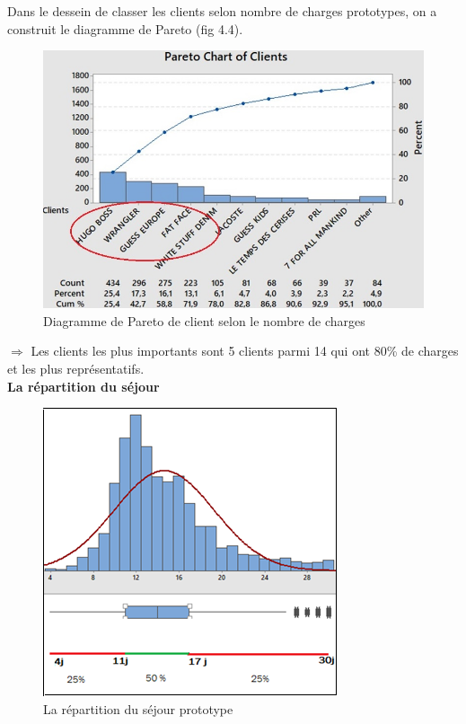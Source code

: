 \documentclass[12pt, a4paper]{thesis}
\begin{document}
Dans le dessein de classer les clients selon nombre de charges prototypes, on a construit le diagramme de Pareto (fig 4.4).

 \begin{figure}[!h]

 \begin{center}

 \includegraphics[scale=0.65]{parProto.jpg}

 \caption{Diagramme de Pareto de client selon le nombre de charges }

 \end{center}

\end{figure}

$ \Longrightarrow$ Les clients les plus importants sont 5 clients parmi 14 qui ont  80\% de charges et les plus représentatifs.\\

 \textbf{La répartition du séjour}\\

 \begin{figure}[!h]
 \begin{center}
\includegraphics[scale=0.9]{reparproto.png}
 \caption{La répartition du séjour prototype}
 \end{center}
 \end{figure}
 
\end{document}
